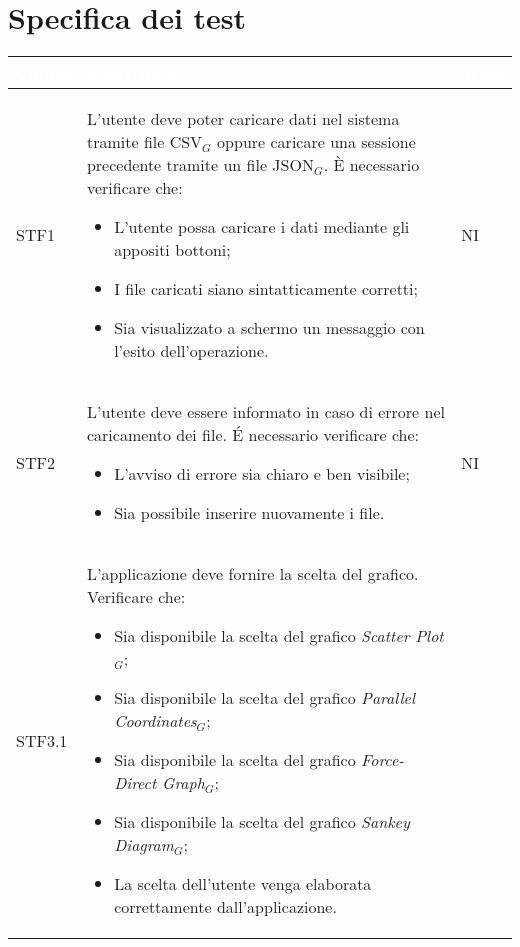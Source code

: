 \section{Specifica dei test}
\begin{center}
    \renewcommand\arraystretch{1.5}
    \centering
    \begin{longtable}{|p{1.5cm}|p{11cm}|p{1cm}|}
    \hline
    \rowcolor[HTML]{036400}
    \textcolor{white}{\textbf{Codice}} & \textcolor{white}{\textbf{Descrizione}} & \textcolor{white}{\textbf{Stato}} \\ \hline
        \rowcolor[HTML]{EFEFEF}
        STF1 & L'utente deve poter caricare dati nel sistema tramite file CSV$_G$ oppure caricare una sessione precedente tramite un file JSON$_G$. \`E necessario verificare che: \begin{itemize}
            \item L'utente possa caricare i dati mediante gli appositi bottoni;
            \item I file caricati siano sintatticamente corretti;
            \item Sia visualizzato a schermo un messaggio con l'esito dell'operazione.
        \end{itemize} & NI\\ \hline
        \rowcolor[HTML]{C0C0C0}
        STF2 & L'utente deve essere informato in caso di errore nel caricamento dei file. \'E necessario verificare che: \begin{itemize}
            \item L'avviso di errore sia chiaro e ben visibile;
            \item Sia possibile inserire nuovamente i file.
        \end{itemize} & NI\\ \hline
        \rowcolor[HTML]{EFEFEF}
        STF3.1 & L'applicazione deve fornire la scelta del grafico. Verificare che: \begin{itemize}
            \item Sia disponibile la scelta del grafico \textit{Scatter Plot}$_G$;
            \item Sia disponibile la scelta del grafico \textit{Parallel Coordinates}$_G$;
            \item Sia disponibile la scelta del grafico \textit{Force-Direct Graph}$_G$;
            \item Sia disponibile la scelta del grafico \textit{Sankey Diagram}$_G$;
            \item La scelta dell'utente venga elaborata correttamente dall'applicazione.

\end{itemize}
\end{longtable}
\end{center}
